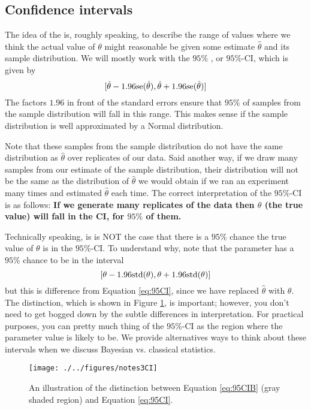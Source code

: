 \subsection{Confidence intervals}


The idea of the  is, roughly speaking, to describe the range of values where we think the actual value of $\theta$ might reasonable be given some estimate $\hat{\theta}$ and its sample distribution. We will mostly work with the $95\%$ , or $95\%$-CI, which is given by 
\begin{equation}\label{eq:95CI}
[\hat{\theta} - 1.96{\rm se}(\hat{\theta}), \hat{\theta} + 1.96{\rm se}(\hat{\theta})]
\end{equation}
The factors $1.96$ in front of the standard errors ensure that $95\%$ of samples from the sample distribution will fall in this range. 
This makes sense if the sample distribution is well approximated by a Normal distribution. 


Note that these samples from the sample distribution do not have the same distribution as $\hat{\theta}$ over replicates of our data. Said another way, if we draw many samples from our estimate of the sample distribution, their distribution will not be the same as the distribution of $\hat{\theta}$ we would obtain if we ran an experiment many times and estimated $\hat{\theta}$ each time. The correct interpretation of the $95\%$-CI is as follows: {\bf If we generate many replicates of the data then $\theta$ (the true value) will fall in the CI, for $95\%$ of them.} 

Technically speaking, is is NOT the case that there is a $95\%$ chance the true value of $\theta$ is in the $95\%$-CI. 
To understand why, note that the parameter has a $95\%$ chance to be in the interval 
\begin{equation}\label{eq:95CIB}
[\theta - 1.96{\rm std}(\theta),\theta + 1.96{\rm std}(\theta)]
\end{equation}
but this is difference from Equation \ref{eq:95CI}, since we have replaced $\hat{\theta}$ with $\theta$. The distinction, which is shown in Figure \ref{fig:CI}, is important; however, you don't need to get bogged down by the subtle differences in interpretation. For practical purposes, you can pretty much thing of the $95\%$-CI as the region where the parameter value is likely to be. We provide alternatives ways to think about these intervals when we discuss Bayesian vs. classical statistics. 


\begin{figure}[h]
\centering
\texttt{[image: ./../figures/notes3CI]}
\caption{An illustration of the distinction between Equation \ref{eq:95CIB} (gray shaded region) and Equation \ref{eq:95CI}.   }\label{fig:CI}
\end{figure}

